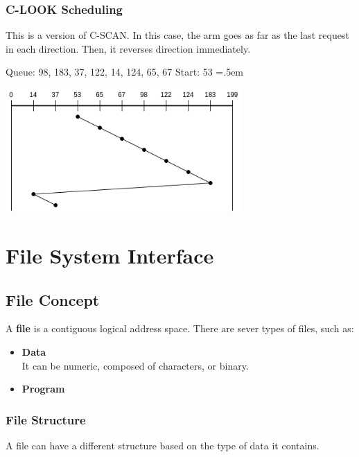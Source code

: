 \documentclass{article}
\newenvironment{cverbatim}
 {\SaveVerbatim{cverb}}
 {\endSaveVerbatim
  \flushleft\fboxrule=0pt\fboxsep=.5em
  \colorbox{cverbbg}{\BUseVerbatim{cverb}}%
  \endflushleft
}
\begin{document}
\subsubsection{C-LOOK Scheduling}
This is a version of C-SCAN. In this case, the arm goes as far as the last request in each direction. Then, it reverses direction immediately.

\begin{cverbatim}
Queue: 98, 183, 37, 122, 14, 124, 65, 67
Start: 53
\end{cverbatim}
\vspace{.3cm}
\centerline{\includegraphics[width=9cm]{./assets/clook.png}}
\vspace{.3cm}

\section{File System Interface}
\subsection{File Concept}
A \textbf{file} is a contiguous logical address space. There are sever types of files, such as:

\begin{itemize}
	\item \textbf{Data}
	\vspace{.2cm} \\
	It can be numeric, composed of characters, or binary.
	
	\item \textbf{Program}
\end{itemize}

\subsubsection{File Structure}
A file can have a different structure based on the type of data it contains.
\end{document}
